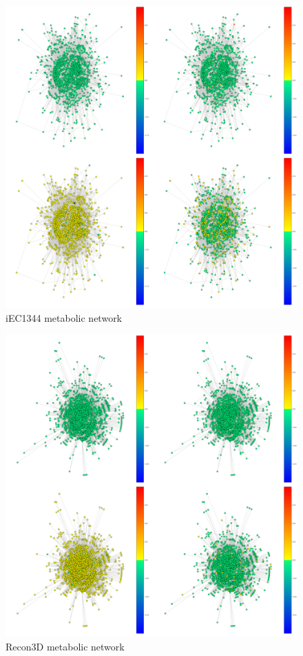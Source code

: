 \documentclass{article} %
\begin{document}
\begin{figure}[H]
      \graphicspath{ {images/} }
      \begin{center}
            \includegraphics[scale=0.2]{images/iEC1344_C-4.png}
      \end{center}
      \caption{iEC1344 metabolic network}\label{fig:iEC1344_C-4}
\end{figure}

\begin{figure}[H]
      \graphicspath{ {images/} }
      \begin{center}
            \includegraphics[scale=0.2]{images/Recon3D-4.png}
      \end{center}
      \caption{Recon3D metabolic network}\label{fig:Recon3D-4}
\end{figure}
\end{document}
